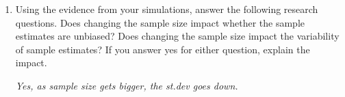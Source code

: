 \begin{enumerate}
\item Using the evidence from your simulations, answer the following
  research questions. Does changing the sample size impact whether the
  sample estimates are unbiased?  Does changing the sample size impact
  the variability of sample estimates?  If you answer yes for either
  question, explain the impact.
       \begin{students}
  \vspace{2cm}
\end{students}    
\begin{key}
   {\it  Yes, as sample size gets bigger, the st.dev goes down.}
\end{key}
 
\begin{students}
  \newpage
\end{students}








\end{enumerate}
